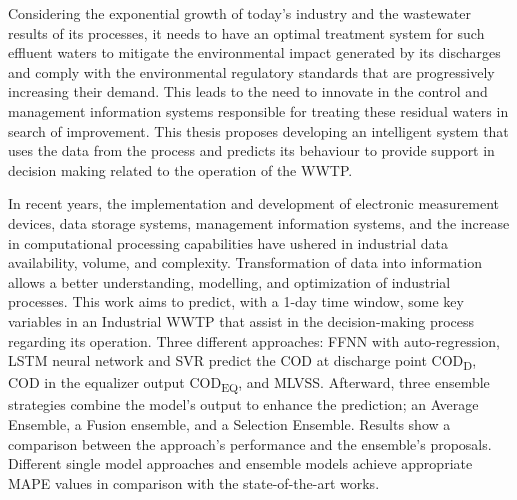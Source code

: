 Considering the exponential growth of today’s industry and the wastewater results of its processes, it needs to have an optimal treatment system for such effluent waters to mitigate the environmental impact generated by its discharges and comply with the environmental regulatory standards that are progressively increasing their demand. This leads to the need to innovate in the control and management information systems responsible for treating these residual waters in search of improvement. This thesis proposes developing an intelligent system that uses the data from the process and predicts its behaviour to provide support in decision making related to the operation of the \ac{WWTP}. %
 
 In recent years, the implementation and development of electronic measurement devices, data storage systems, management information systems, and the increase in computational processing capabilities have ushered in industrial data availability, volume, and complexity. Transformation of data into information allows a better understanding, modelling, and optimization of industrial processes. This work aims to predict, with a 1-day time window, some key variables in an Industrial \ac{WWTP} that assist in the decision-making process regarding its operation. Three different approaches: \ac{FFNN} with auto-regression, \ac{LSTM} neural network and \ac{SVR} predict the \ac{COD} at discharge point \ac{COD}\textsubscript{D}, COD in the equalizer output \ac{COD}\textsubscript{EQ}, and \ac{MLVSS}. Afterward, three ensemble strategies combine the model's output to enhance the prediction; an Average Ensemble, a Fusion ensemble, and a Selection Ensemble. Results show a comparison between the approach's performance and the ensemble's proposals. Different single model approaches and ensemble models achieve appropriate \ac{MAPE} values in comparison with the state-of-the-art works.



